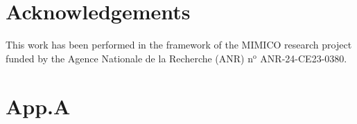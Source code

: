 \documentclass[sn-mathphys]{sn-jnl}
\theoremstyle{thmstyleone}%
\theoremstyle{thmstyletwo}%
\theoremstyle{thmstylethree}%
\begin{document}
\section*{Acknowledgements}
This work has been performed in the framework of the MIMICO research project funded by the Agence Nationale de la Recherche (ANR) n$^\text{o}$ ANR-24-CE23-0380. 




\appendix

\section{App.A}
\end{document}
